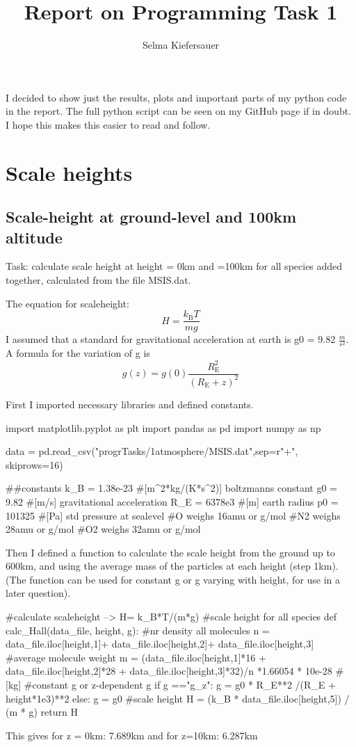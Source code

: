 \documentclass[a4paper, 12pt]{article}
\begin{document}
\author{Selma Kiefersauer}
\title{Report on Programming Task 1}
\maketitle

I decided to show just the results, plots and important parts of my python code in the report. The full python script can be seen on my GitHub page if in doubt. I hope this makes this easier to read and follow. 

\section{Scale heights}
\subsection{ Scale-height at ground-level and 100km altitude}
Task: calculate scale height at height = 0km and =100km for all species added together, calculated from the file MSIS.dat. 

The equation for scaleheight: 
\begin{equation}
H = \frac{ k_{\text{B}}T}{ mg}
\end{equation}
I assumed that a standard for gravitational acceleration at earth is g0 = 9.82 $\frac{m}{s^2}$. 
A formula for the variation of g is
\begin{equation}
g(z) = g(0) \frac{R^2_{\text{E}}}{(R_{\text{E}}+z)^2}
\end{equation}

First I imported necessary libraries and defined constants.
\begin{python}
import matplotlib.pyplot as plt
import pandas as pd
import numpy as np

data = pd.read_csv("progrTasks/1atmosphere/MSIS.dat",sep=r"\s+", skiprows=16)

##constants
k_B = 1.38e-23     #[m^2*kg/(K*s^2)] boltzmanns constant
g0 = 9.82 #[m/s] gravitational acceleration
R_E = 6378e3 #[m] earth radius
p0 = 101325 #[Pa] std pressure at sealevel
#O weighs 16amu or g/mol
#N2 weighs 28amu or g/mol
#O2 weighs 32amu or g/mol
\end{python}

Then I defined a function to calculate the scale height from the ground up to 600km, and using the average mass of the particles at each height (step 1km).
(The function can be used for constant g or g varying with height, for use in a later question).
\begin{python}
#calculate scaleheight --> H= k_B*T/(m*g)
#scale height for all species
def calc_Hall(data_file, height, g):
     #nr density all molecules
    n = data_file.iloc[height,1]+ data_file.iloc[height,2]+ data_file.iloc[height,3]
    #average molecule weight
    m = (data_file.iloc[height,1]*16 + data_file.iloc[height,2]*28 + data_file.iloc[height,3]*32)/n *1.66054 * 10e-28 #[kg]
    #constant g or z-dependent g
    if g =="g_z":
        g = g0 * R_E**2 /(R_E + height*1e3)**2
    else:
        g = g0
    #scale height
    H = (k_B * data_file.iloc[height,5]) / (m * g)
    return H
\end{python}
This gives for z = 0km: 7.689km and for z=10km: 6.287km
\end{document}
